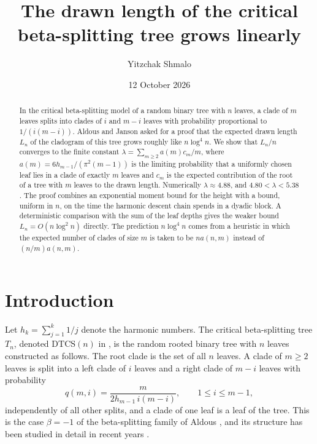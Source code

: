 \documentclass[11pt]{amsart}
\title[The drawn length of the critical beta-splitting tree]{The drawn length of the critical\\ beta-splitting tree grows linearly}
\author{Yitzchak Shmalo}
\date{12 October 2026}
\theoremstyle{remark}
\numberwithin{equation}{section}
\newcommand{\DTCS}{\mathrm{DTCS}}
\begin{document}
\begin{abstract}
In the critical beta-splitting model of a random binary tree with $n$ leaves, a clade of $m$ leaves splits into clades of $i$ and $m-i$ leaves with probability proportional to $1/(i(m-i))$. Aldous and Janson asked for a proof that the expected drawn length $L_n$ of the cladogram of this tree grows roughly like $n\log^4 n$. We show that $L_n/n$ converges to the finite constant $\lambda=\sum_{m\ge2}a(m)c_m/m$, where $a(m)=6h_{m-1}/(\pi^2(m-1))$ is the limiting probability that a uniformly chosen leaf lies in a clade of exactly $m$ leaves and $c_m$ is the expected contribution of the root of a tree with $m$ leaves to the drawn length. Numerically $\lambda\approx4.88$, and $4.80<\lambda<5.38$. The proof combines an exponential moment bound for the height with a bound, uniform in $n$, on the time the harmonic descent chain spends in a dyadic block. A deterministic comparison with the sum of the leaf depths gives the weaker bound $L_n=O(n\log^2n)$ directly. The prediction $n\log^4n$ comes from a heuristic in which the expected number of clades of size $m$ is taken to be $na(n,m)$ instead of $(n/m)a(n,m)$.
\end{abstract}
\maketitle

\section{Introduction}\label{sec:intro}

Let $h_k=\sum_{j=1}^k1/j$ denote the harmonic numbers. The critical beta-splitting tree $T_n$, denoted $\DTCS(n)$ in \cite{AJ23}, is the random rooted binary tree with $n$ leaves constructed as follows. The root clade is the set of all $n$ leaves. A clade of $m\ge2$ leaves is split into a left clade of $i$ leaves and a right clade of $m-i$ leaves with probability
\begin{equation}\label{eq:q}
 q(m,i)=\frac{m}{2h_{m-1}\,i(m-i)},\qquad 1\le i\le m-1,
\end{equation}
independently of all other splits, and a clade of one leaf is a leaf of the tree. This is the case $\beta=-1$ of the beta-splitting family of Aldous \cite{Ald96}, and its structure has been studied in detail in recent years \cite{AP25,AJ23,AJL24,BCM25,Ma26}.
\end{document}
